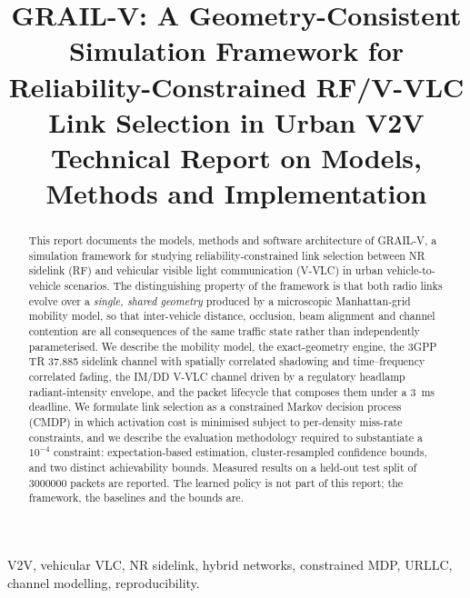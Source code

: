 \documentclass[conference]{IEEEtran}
\begin{document}
\title{GRAIL-V: A Geometry-Consistent Simulation Framework for\\
Reliability-Constrained RF/V-VLC Link Selection in Urban V2V\\
\large Technical Report on Models, Methods and Implementation}

\author{
}

\maketitle

\begin{abstract}
This report documents the models, methods and software architecture of
GRAIL-V, a simulation framework for studying reliability-constrained link
selection between NR sidelink (RF) and vehicular visible light communication
(V-VLC) in urban vehicle-to-vehicle scenarios. The distinguishing property of
the framework is that both radio links evolve over a \emph{single, shared
geometry} produced by a microscopic Manhattan-grid mobility model, so that
inter-vehicle distance, occlusion, beam alignment and channel contention are
all consequences of the same traffic state rather than independently
parameterised. We describe the mobility model, the exact-geometry engine, the
3GPP TR 37.885 sidelink channel with spatially correlated shadowing and
time--frequency correlated fading, the IM/DD V-VLC channel driven by a
regulatory headlamp radiant-intensity envelope, and the packet lifecycle that
composes them under a \SI{3}{\milli\second} deadline. We formulate link
selection as a constrained Markov decision process (CMDP) in which activation
cost is minimised subject to per-density miss-rate constraints, and we
describe the evaluation methodology required to substantiate a $10^{-4}$
constraint: expectation-based estimation, cluster-resampled confidence bounds,
and two distinct achievability bounds. Measured results on a held-out test
split of \num{3000000} packets are reported. The learned policy is not part of
this report; the framework, the baselines and the bounds are.
\end{abstract}

\begin{IEEEkeywords}
V2V, vehicular VLC, NR sidelink, hybrid networks, constrained MDP, URLLC,
channel modelling, reproducibility.
\end{IEEEkeywords}
\end{document}
